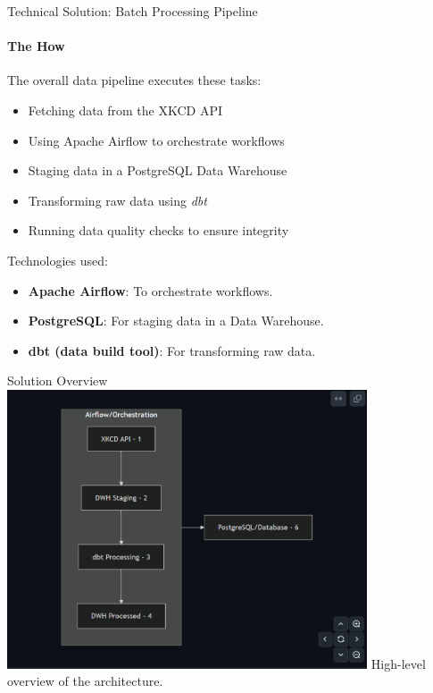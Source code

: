 \documentclass{beamer}
\begin{document}
\begin{frame}[t]{Technical Solution: Batch Processing Pipeline}
\framesubtitle{The How}
\raggedright
    The overall data pipeline executes these tasks:
    \begin{itemize}
        \item Fetching data from the XKCD API
        \item Using Apache Airflow to orchestrate workflows
        \item Staging data in a PostgreSQL Data Warehouse
        \item Transforming raw data using \textit{dbt}
        \item Running data quality checks to ensure integrity
    \end{itemize}
    \vspace{1em}
    Technologies used:
    \begin{itemize}
        \item \textbf{Apache Airflow}: To orchestrate workflows.
        \item \textbf{PostgreSQL}: For staging data in a Data Warehouse.
        \item \textbf{dbt (data build tool)}: For transforming raw data.
    \end{itemize}

\end{frame}

\begin{frame}{Solution Overview}
    \centering
    \includegraphics[width=0.8\textwidth]{../screenshots/solution_overview.png}
    \newline
    High-level overview of the architecture.
\end{frame}
\end{document}
